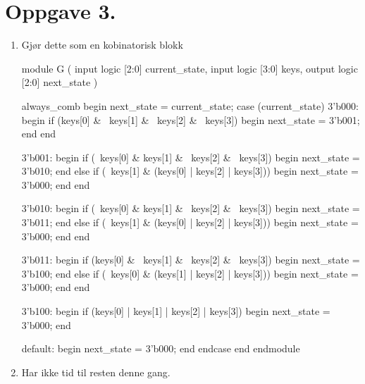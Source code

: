 \documentclass[a4paper,11pt,norsk]{article}
\begin{document}
\section*{Oppgave 3.}
\begin{enumerate}
    \item Gjør dette som en kobinatorisk blokk
\begin{codebox}[verilog]
module G (
    input logic [2:0] current_state,
    input logic [3:0] keys,
    output logic [2:0] next_state
    )

    always_comb begin
        next_state = current_state;
        case (current_state)
            3'b000: begin
                if (keys[0] & ~keys[1] & ~keys[2] & ~keys[3]) begin
                    next_state = 3'b001;
                end
            end

            3'b001: begin
                if (~keys[0] & keys[1] & ~keys[2] & ~keys[3]) begin
                    next_state = 3'b010;
                end else if (~keys[1] & (keys[0] | keys[2] | keys[3])) begin
                    next_state = 3'b000;
                end
            end

            3'b010: begin
                if (~keys[0] & keys[1] & ~keys[2] & ~keys[3]) begin
                    next_state = 3'b011;
                end else if (~keys[1] & (keys[0] | keys[2] | keys[3])) begin
                    next_state = 3'b000;
                end
            end

            3'b011: begin
                if (keys[0] & ~keys[1] & ~keys[2] & ~keys[3]) begin
                    next_state = 3'b100;
                end else if (~keys[0] & (keys[1] | keys[2] | keys[3])) begin
                    next_state = 3'b000;
                end
            end

            3'b100: begin
            if (keys[0] | keys[1] | keys[2] | keys[3]) begin
                next_state = 3'b000;
            end

            default: begin
                next_state = 3'b000;
            end
        endcase
    end
endmodule
\end{codebox}
    \item Har ikke tid til resten denne gang.

\end{enumerate}
\end{document}
